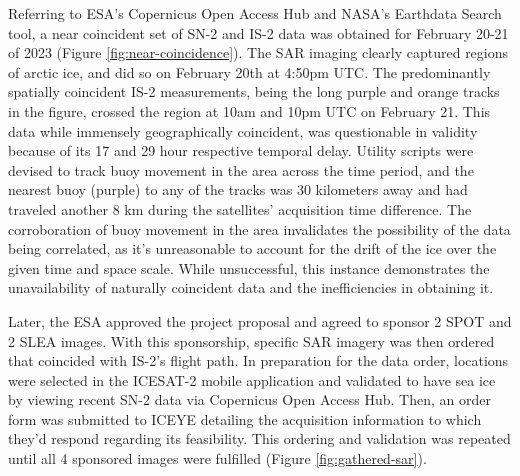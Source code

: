 Referring to ESA's Copernicus Open Access Hub and NASA's Earthdata Search tool, a near coincident set of SN-2 and IS-2 data was obtained for February 20-21 of 2023 (Figure \ref{fig:near-coincidence}). The SAR imaging clearly captured regions of arctic ice, and did so on February 20th at 4:50pm UTC. The predominantly spatially coincident IS-2 measurements, being the long purple and orange tracks in the figure, crossed the region at 10am and 10pm UTC on February 21. This data while immensely geographically coincident, was questionable in validity because of its 17 and 29 hour respective temporal delay. Utility scripts were devised to track buoy movement in the area across the time period, and the nearest buoy (purple) to any of the tracks was 30 kilometers away and had traveled another 8 km during the satellites' acquisition time difference. The corroboration of buoy movement in the area invalidates the possibility of the data being correlated, as it's unreasonable to account for the drift of the ice over the given time and space scale. While unsuccessful, this instance demonstrates the unavailability of naturally coincident data and the inefficiencies in obtaining it.

Later, the ESA approved the project proposal and agreed to sponsor 2 SPOT and 2 SLEA images. With this sponsorship, specific SAR imagery was then ordered that coincided with IS-2's flight path. In preparation for the data order, locations were selected in the ICESAT-2 mobile application and validated to have sea ice by viewing recent SN-2 data via Copernicus Open Access Hub. Then, an order form was submitted to ICEYE detailing the acquisition information to which they'd respond regarding its feasibility. This ordering and validation was repeated until all 4 sponsored images were fulfilled (Figure \ref{fig:gathered-sar}).

